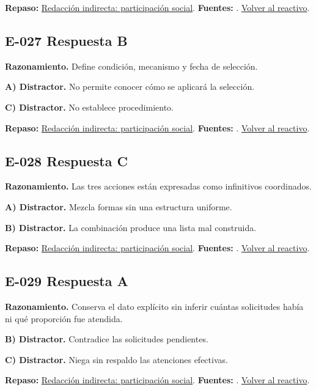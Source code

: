\textbf{Repaso:} \hyperref[sec:e2]{Redacción indirecta: participación social}. \textbf{Fuentes:} \cite{rae,writing}. \hyperref[q:E-026]{Volver al reactivo}.\par\medskip

\subsection*{E-027 \quad Respuesta B}\label{s:E-027}
\textbf{Razonamiento.} Define condición, mecanismo y fecha de selección.

\textbf{A) Distractor. }No permite conocer cómo se aplicará la selección.

\textbf{C) Distractor. }No establece procedimiento.

\textbf{Repaso:} \hyperref[sec:e2]{Redacción indirecta: participación social}. \textbf{Fuentes:} \cite{rae,writing}. \hyperref[q:E-027]{Volver al reactivo}.\par\medskip

\subsection*{E-028 \quad Respuesta C}\label{s:E-028}
\textbf{Razonamiento.} Las tres acciones están expresadas como infinitivos coordinados.

\textbf{A) Distractor. }Mezcla formas sin una estructura uniforme.

\textbf{B) Distractor. }La combinación produce una lista mal construida.

\textbf{Repaso:} \hyperref[sec:e2]{Redacción indirecta: participación social}. \textbf{Fuentes:} \cite{rae,writing}. \hyperref[q:E-028]{Volver al reactivo}.\par\medskip

\subsection*{E-029 \quad Respuesta A}\label{s:E-029}
\textbf{Razonamiento.} Conserva el dato explícito sin inferir cuántas solicitudes había ni qué proporción fue atendida.

\textbf{B) Distractor. }Contradice las solicitudes pendientes.

\textbf{C) Distractor. }Niega sin respaldo las atenciones efectivas.

\textbf{Repaso:} \hyperref[sec:e2]{Redacción indirecta: participación social}. \textbf{Fuentes:} \cite{rae,writing}. \hyperref[q:E-029]{Volver al reactivo}.\par\medskip

